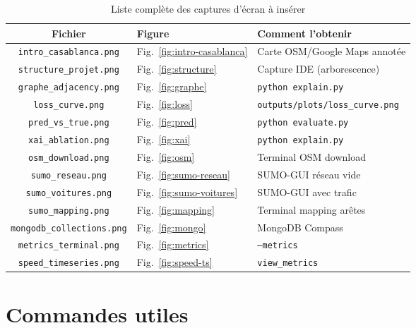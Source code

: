 \documentclass[12pt,a4paper]{report}
\begin{document}
\begin{table}[H]
  \centering
  \small
  \begin{tabular}{clp{6.5cm}}
    \toprule
    Fichier & Figure & Comment l'obtenir \\
    \midrule
    \texttt{intro\_casablanca.png}      & Fig.~\ref{fig:intro-casablanca} & Carte OSM/Google Maps annotée \\
    \texttt{structure\_projet.png}      & Fig.~\ref{fig:structure}        & Capture IDE (arborescence) \\
    \texttt{graphe\_adjacency.png}       & Fig.~\ref{fig:graphe}           & \texttt{python explain.py} \\
    \texttt{loss\_curve.png}             & Fig.~\ref{fig:loss}             & \texttt{outputs/plots/loss\_curve.png} \\
    \texttt{pred\_vs\_true.png}           & Fig.~\ref{fig:pred}             & \texttt{python evaluate.py} \\
    \texttt{xai\_ablation.png}           & Fig.~\ref{fig:xai}              & \texttt{python explain.py} \\
    \texttt{osm\_download.png}           & Fig.~\ref{fig:osm}              & Terminal OSM download \\
    \texttt{sumo\_reseau.png}            & Fig.~\ref{fig:sumo-reseau}      & SUMO-GUI réseau vide \\
    \texttt{sumo\_voitures.png}          & Fig.~\ref{fig:sumo-voitures}    & SUMO-GUI avec trafic \\
    \texttt{sumo\_mapping.png}           & Fig.~\ref{fig:mapping}          & Terminal mapping arêtes \\
    \texttt{mongodb\_collections.png}    & Fig.~\ref{fig:mongo}            & MongoDB Compass \\
    \texttt{metrics\_terminal.png}       & Fig.~\ref{fig:metrics}          & \texttt{--metrics} \\
    \texttt{speed\_timeseries.png}       & Fig.~\ref{fig:speed-ts}         & \texttt{view\_metrics} \\
    \bottomrule
  \end{tabular}
  \caption{Liste complète des captures d'écran à insérer}
\end{table}

\chapter{Commandes utiles}
\end{document}
